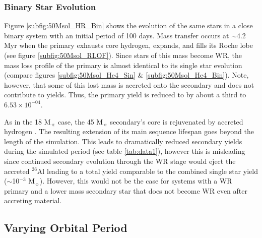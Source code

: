 \subsubsection{Binary Star Evolution}

Figure \ref{subfig:50Msol_HR_Bin} shows the evolution of the same stars in a close binary system with an initial period of 100 days.
Mass transfer occurs at $\sim$4.2 Myr when the primary exhausts core hydrogen, expands, and fills its Roche lobe (see figure \ref{subfig:50Msol_RLOF}).
Since stars of this mass become WR, the mass loss profile of the primary is almost identical to its single star evolution (compare figures \ref{subfig:50Msol_He4_Sin} \& \ref{subfig:50Msol_He4_Bin}). Note, however, that some of this lost mass is accreted onto the secondary and does not contribute to yields. Thus, the primary yield is reduced to by about a third to $6.53\times10^{-04}$.

As in the 18 M$_{\sun}$ case, the 45 M$_{\sun}$ secondary's core is rejuvenated by accreted hydrogen \citep[see][]{2007MNRAS.376...61D}. The resulting extension of its main sequence lifespan goes beyond the length of the simulation.
This leads to dramatically reduced secondary yields during the simulated period (see table \ref{tab:data1}), however this is misleading since continued secondary evolution through the WR stage would eject the accreted $^{26}$Al leading to a total yield comparable to the combined single star yield ($\sim$10$^{-3}$ M$_{\sun}$).
However, this would not be the case for systems with a WR primary and a lower mass secondary star that does not become WR even after accreting material.

\subsection{Varying Orbital Period} \label{Period}

